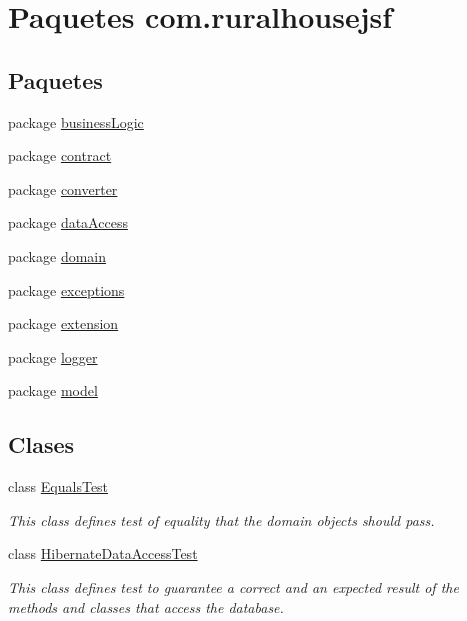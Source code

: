 \hypertarget{a00110}{}\section{Paquetes com.\+ruralhousejsf}
\label{a00110}
\subsection*{Paquetes}
\begin{DoxyCompactItemize}
\item 
package \mbox{\hyperlink{a00108}{business\+Logic}}
\item 
package \mbox{\hyperlink{a00123}{contract}}
\item 
package \mbox{\hyperlink{a00111}{converter}}
\item 
package \mbox{\hyperlink{a00112}{data\+Access}}
\item 
package \mbox{\hyperlink{a00114}{domain}}
\item 
package \mbox{\hyperlink{a00118}{exceptions}}
\item 
package \mbox{\hyperlink{a00124}{extension}}
\item 
package \mbox{\hyperlink{a00119}{logger}}
\item 
package \mbox{\hyperlink{a00121}{model}}
\end{DoxyCompactItemize}
\subsection*{Clases}
\begin{DoxyCompactItemize}
\item 
class \mbox{\hyperlink{a00248}{Equals\+Test}}
\begin{DoxyCompactList}\small\item\em This class defines test of equality that the domain objects should pass. \end{DoxyCompactList}\item 
class \mbox{\hyperlink{a00272}{Hibernate\+Data\+Access\+Test}}
\begin{DoxyCompactList}\small\item\em This class defines test to guarantee a correct and an expected result of the methods and classes that access the database. \end{DoxyCompactList}\end{DoxyCompactItemize}
